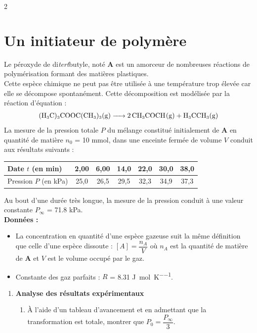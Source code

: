 \documentclass[a4paper,11pt,fleqn]{article}%
\begin{document}
\begin{multicols}{2}
\section{Un initiateur de polymère}
Le péroxyde de di\emph{tert}butyle, noté \textbf{A} est un amorceur de nombreuses réactions de polymérisation formant des matières plastiques.\\
Cette espèce chimique ne peut pas être utilisée à une température trop élevée car elle se décompose spontanément. Cette décomposition est modélisée par la réaction d'équation :
\begin{eqnarray}
    \small \ce{(H3C)3COOC(CH3)3(g) -> 2CH3COCH(g) + H3CCH3(g)}\nonumber
\end{eqnarray}
La mesure de la pression totale $P$ du mélange constitué initialement de \textbf{A} en quantité de matière $n_0$ = \num{10} \unit{\milli\mole}, dans une enceinte fermée de volume $V$ conduit aux résultats suivants :
\begin{center}
\begin{tabular}{|>{\centering}m{.2\linewidth}|c|c|c|c|c|c|}
    \hline Date $t$ (en \unit{\minute}) & 2,00 & 6,00 & 14,0 & 22,0 & 30,0 & 38,0 \\
    \hline Pression $P$ (en \unit{\kilo\pascal}) & 25,0 & 26,5 & 29,5 & 32,3 & 34,9 & 37,3\\
    \hline
\end{tabular}
\end{center}
Au bout d'une durée très longue, la mesure de la pression conduit à une valeur constante $P_{\infty}$ = \num{71,8} \unit{\kilo\pascal}.\\
\textbf{Données :}
\begin{itemize}
    \item La concentration en quantité d'une espèce gazeuse suit la même définition que celle d'une espèce dissoute : $[A] = \dfrac{n_A}{V}$ où $n_A$ est la quantité de matière de \textbf{A} et $V$ est le volume occupé par le gaz.
    \item Constante des gaz parfaits : $R$ = \num{8,31} \unit{\joule\per\mole\per\kelvin}.
\end{itemize}
\begin{enumerate}
    \item \textbf{Analyse des résultats expérimentaux}
    \begin{enumerate}
        \item À l'aide d'un tableau d'avancement et en admettant que la transformation est totale, montrer que $P_0 = \dfrac{P_{\infty}}{3}$.

\end{enumerate}
\end{enumerate}
\end{multicols}
\end{document}
